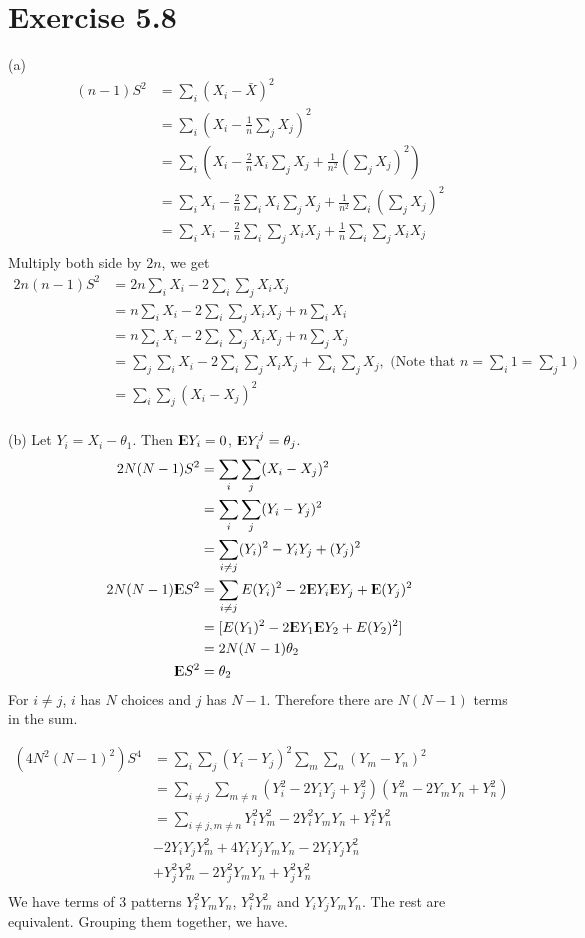 \documentclass[12pt]{article}
\begin{document}
\section*{Exercise 5.8}
(a) $$
\begin{aligned}
	(n-1)S^2 &= \sum_i (X_i - \bar{X})^2 \\
	    &= \sum_i \left(X_i - \frac{1}{n} \sum_j X_j\right)^2 \\
	    &= \sum_i \left(X_i - \frac{2}{n} X_i \sum_j X_j + \frac{1}{n^2} \left(\sum_j X_j\right)^2 \right) \\
	    &= \sum_i X_i - \frac{2}{n} \sum_i X_i \sum_j X_j + \frac{1}{n^2} \sum_i \left(\sum_j X_j\right)^2 \\
	    &= \sum_i X_i - \frac{2}{n} \sum_i \sum_j X_i X_j + \frac{1}{n} \sum_i \sum_j X_i X_j \\
\end{aligned}
$$
Multiply both side by $2n$, we get 
$$
\begin{aligned}
	2n(n-1)S^2 &= 2n \sum_i X_i - 2 \sum_i \sum_j X_i X_j \\
	&= n \sum_i X_i - 2 \sum_i \sum_j X_i X_j + n \sum_i X_i \\
	&= n \sum_i X_i - 2 \sum_i \sum_j X_i X_j + n \sum_j X_j \\
	&= \sum_j \sum_i X_i - 2 \sum_i \sum_j X_i X_j + \sum_i \sum_j X_j , \mbox{ (Note that } n=\sum_i 1=\sum_j 1 \mbox{ )} \\
	&=  \sum_i \sum_j (X_i - X_j)^2 \\
\end{aligned}
$$ 
\QED 

(b) Let $Y_i = X_i - \theta_1$. Then ${\rm I\kern-.3em E} Y_i = 0$, ${\rm I\kern-.3em E} Y_i^j = \theta_j$. $$\begin{aligned}
	 2N(N-1)S^2 &= \sum_i \sum_j (X_i - X_j)^2 \\
	 &= \sum_i \sum_j (Y_i - Y_j)^2 \\
	 &=  \sum_{i\neq j} (Y_i)^2 - Y_i Y_j + (Y_j)^2 \\
	 2N(N-1) \E S^2 &=\sum_{i\neq j} E(Y_i)^2 - 2\E Y_i \E Y_j + \E (Y_j)^2 \\
	   		 &= [E(Y_1)^2 - 2\E Y_1 \E Y_2 + E(Y_2)^2] \\
	   		 &= 2N(N-1) \theta_2 \\
	   \E S^2 &= \theta_2
\end{aligned}$$
For $i\neq j$, $i$ has $N$ choices and $j$ has $N-1$. Therefore there are $N(N-1)$ terms in the sum.

$$ \begin{aligned}
	(4N^2(N-1)^2)S^4 &=  \sum_i \sum_j (Y_i - Y_j)^2 \sum_m \sum_n (Y_m - Y_n)^2 \\
	&= \sum_{i\neq j}\sum_{m\neq n} (Y_i^2 -2 Y_i Y_j + Y_j^2)(Y_m^2 - 2Y_m Y_n + Y_n^2) \\
	&= \sum_{i\neq j, m\neq n} Y_i^2 Y_m^2 -2Y_i^2 Y_m Y_n + Y_i^2 Y_n^2 \\
	& -2Y_i Y_j Y_m^2 + 4Y_iY_jY_mY_n - 2Y_iY_jY_n^2 \\
	& + Y_j^2Y_m^2 - 2Y_j^2Y_mY_n + Y_j^2 Y_n^2 \\
\end{aligned}$$
We have terms of 3 patterns $Y_i^2 Y_m Y_n$, $Y_i^2Y_m^2$ and $Y_iY_jY_mY_n$. The rest are equivalent. Grouping them together, we have.
\end{document}
